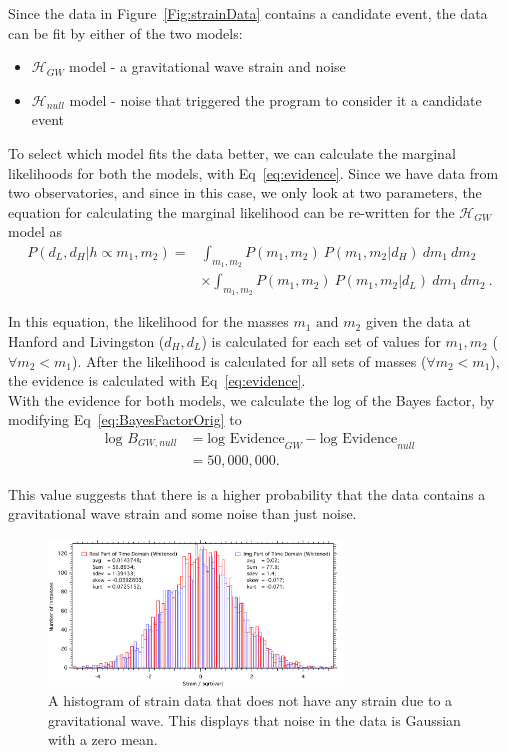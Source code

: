 \documentclass{article}
\makeatletter
\newcommand\mynobreakpar{\par\nobreak\@afterheading}
\makeatother
\begin{document}
 Since the data in Figure~\ref{Fig:strainData} contains a candidate event, the data can be fit by either of the two models:  \mynobreakpar
 \begin{itemize}
 	\item $\mathcal{H}_{GW}$ model - a gravitational wave strain and noise \mynobreakpar
 	\item $\mathcal{H}_{null}$ model - noise that triggered the program to consider it a candidate event
 \end{itemize}
 
 To select which model fits the data better, we can calculate the marginal likelihoods for both the models, with Eq~\ref{eq:evidence}. Since we have data from two observatories, and since in this case, we only look at two parameters, the equation for calculating the marginal likelihood can be re-written for the $\mathcal{H}_{GW}$ model as 
 \begin{align*}
 	P(d_L,d_H | h\propto m_1, m_2) = & \int_{m_1, m_2} { P(m_1,m_2) \ P(m_1,m_2 | d_H)\ dm_1\ dm_2 } \\
 	& \times \int_{m_1, m_2} { P(m_1,m_2) \ P(m_1,m_2 | d_L)\ dm_1\ dm_2 } \ .
 \end{align*}
 
 
 In this equation, the likelihood for the masses $m_1 \text{ and } m_2$ given the data at Hanford and Livingston ($d_H, d_L$) is calculated for each set of values for $m_1,m_2$ ($\forall m_2 < m_1$). After the likelihood is calculated for all sets of masses ($\forall m_2 < m_1$), the evidence is calculated with Eq~\ref{eq:evidence}.\\
 
 
 With the evidence for both models, we calculate the log of the Bayes factor, by modifying Eq~\ref{eq:BayesFactorOrig} to 
 \begin{align*}
\text{log }B_{GW,null} &= \text{log Evidence}_{GW} - \text{log Evidence}_{null} \\
&= 50,000,000.
 \end{align*}
 
  This value suggests that there is a higher probability that the data contains a gravitational wave strain and some noise than just noise.\\ 
 
 
    \begin{figure}[h]
    	\centering
    	\includegraphics[width=0.7\textwidth]{Figures/NoiseHistogram.pdf} 
    	\caption{A histogram of strain data that does not have any strain due to a gravitational wave. This displays that noise in the data is Gaussian with a zero mean.}
    	\label{Fig:NoiseHist}
    \end{figure}
    
\end{document}
